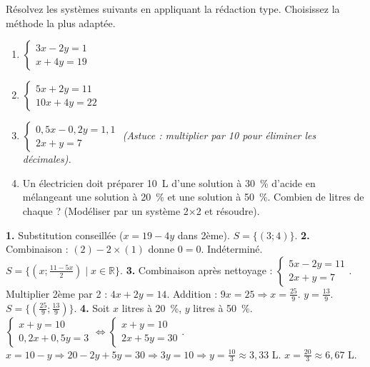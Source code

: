 \documentclass[11pt]{article}
\begin{document}
\begin{exercice}
Résolvez les systèmes suivants en appliquant la rédaction type. Choisissez la méthode la plus adaptée.
\begin{enumerate}
\item $\begin{cases} 3x - 2y = 1 \\ x + 4y = 19 \end{cases}$
\item $\begin{cases} 5x + 2y = 11 \\ 10x + 4y = 22 \end{cases}$
\item $\begin{cases} 0{,}5x - 0{,}2y = 1{,}1 \\ 2x + y = 7 \end{cases}$ \emph{(Astuce : multiplier par 10 pour éliminer les décimales).}
\item Un électricien doit préparer \SI{10}{\liter} d'une solution à \SI{30}{\percent} d'acide en mélangeant une solution à \SI{20}{\percent} et une solution à \SI{50}{\percent}. Combien de litres de chaque ? (Modéliser par un système 2×2 et résoudre).
\end{enumerate}
\end{exercice}

\begin{corrige}[Exercice n°1]
\textbf{1.} Substitution conseillée ($x = 19 - 4y$ dans 2ème). $S = \{(3 ; 4)\}$.
\textbf{2.} Combinaison : $(2) - 2\times(1)$ donne $0=0$. Indéterminé. $S = \{(x ; \frac{11-5x}{2}) \mid x \in \mathbb{R}\}$.
\textbf{3.} Combinaison après nettoyage : $\begin{cases} 5x - 2y = 11 \\ 2x + y = 7 \end{cases}$. Multiplier 2ème par 2 : $4x+2y=14$. Addition : $9x=25 \Rightarrow x=\frac{25}{9}$. $y=\frac{13}{9}$. $S = \{(\frac{25}{9} ; \frac{13}{9})\}$.
\textbf{4.} Soit $x$ litres à \SI{20}{\percent}, $y$ litres à \SI{50}{\percent}. $\begin{cases} x+y=10 \\ 0{,}2x+0{,}5y=3 \end{cases} \iff \begin{cases} x+y=10 \\ 2x+5y=30 \end{cases}$. $x=10-y \Rightarrow 20-2y+5y=30 \Rightarrow 3y=10 \Rightarrow y=\frac{10}{3} \approx 3,33$ L. $x=\frac{20}{3} \approx 6,67$ L.
\end{corrige}
\end{document}
